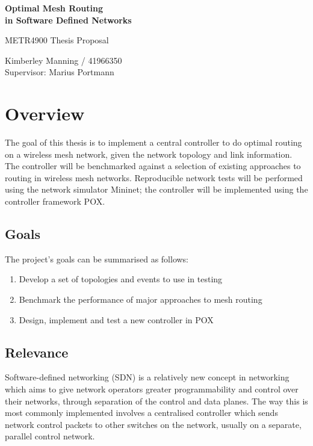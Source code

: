 \documentclass[pdftex,12pt,a4paper]{article}
\begin{document}
\thispagestyle{empty}
\begin{center}
	\vspace*{35mm}
	{\huge\bf
		Optimal Mesh Routing \\
		in Software Defined Networks \\
	}

	\vspace{20mm}
	{\Large 
		METR4900 Thesis Proposal \\
	}

	\vspace{20mm}
	Kimberley Manning / 41966350 \\
	Supervisor: Marius Portmann
\end{center}

\newpage
\thispagestyle{empty}
\tableofcontents
\listoftables

\newpage
{}
\section{Overview}
The goal of this thesis is to implement a central controller to do optimal routing on a wireless mesh network, given the network topology and link information. The controller will be benchmarked against a selection of existing approaches to routing in wireless mesh networks. Reproducible network tests will be performed using the network simulator Mininet; the controller will be implemented using the controller framework POX.

\subsection{Goals}
The project's goals can be summarised as follows:

\begin{enumerate}
	\item Develop a set of topologies and events to use in testing
	\item Benchmark the performance of major approaches to mesh routing
	\item Design, implement and test a new controller in POX
\end{enumerate}

\subsection{Relevance}
Software-defined networking (SDN) is a relatively new concept in networking which aims to give network operators greater programmability and control over their networks, through separation of the control and data planes. The way this is most commonly implemented involves a centralised controller which sends network control packets to other switches on the network, usually on a separate, parallel control network. 
\end{document}
